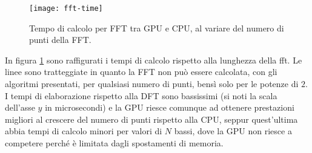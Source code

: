 \begin{figure}[h!]
    \centering
    \texttt{[image: fft-time]}
    \caption{Tempo di calcolo per FFT tra GPU e CPU, al variare del numero di punti della FFT.}
    \label{fig:ffttime}
\end{figure}

In figura \ref{fig:ffttime} sono raffigurati i tempi di calcolo rispetto alla lunghezza della fft. Le linee sono tratteggiate in quanto la FFT non può essere calcolata, con gli algoritmi presentati, per qualsiasi numero di punti, bensì solo per le potenze di $2$. I tempi di elaborazione rispetto alla DFT sono bassissimi (si noti la scala dell'asse $y$ in microsecondi) e la GPU riesce comunque ad ottenere prestazioni migliori al crescere del numero di punti rispetto alla CPU, seppur quest'ultima abbia tempi di calcolo minori per valori di $N$ bassi, dove la GPU non riesce a competere perché è limitata dagli spostamenti di memoria.